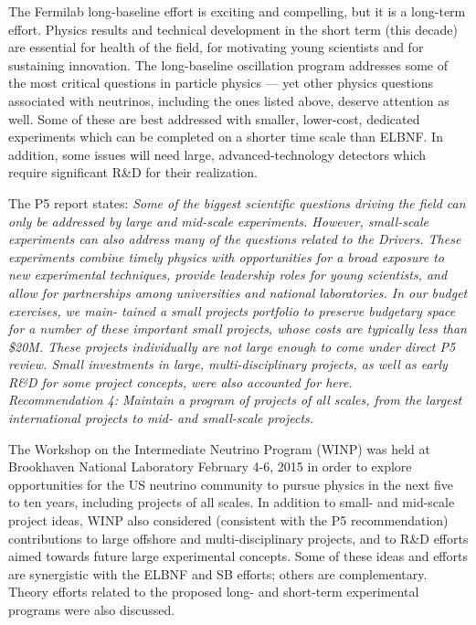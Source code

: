The Fermilab long-baseline effort is exciting and compelling, but it
is a long-term effort.  Physics results and technical development in
the short term (this decade) are essential for health of the field,
for motivating young scientists and for sustaining innovation.  The
long-baseline oscillation program addresses some of the most critical
questions in particle physics --- yet other physics questions
associated with neutrinos, including the ones listed above, deserve
attention as well.  Some of these are best addressed with smaller,
lower-cost, dedicated experiments which can be completed
on a shorter time scale than ELBNF.  In addition, some issues will
need large, advanced-technology detectors which require
significant R\&D for their realization.

The P5 report states:
\textit{Some of the biggest scientific questions driving the field can only be
addressed by large and mid-scale experiments. However, small-scale
experiments can also address many of the questions related to the
Drivers. These experiments combine timely physics with opportunities
for a broad exposure to new experimental techniques, provide
leadership roles for young scientists, and allow for partnerships
among universities and national laboratories. In our budget exercises,
we main- tained a small projects portfolio to preserve budgetary space
for a number of these important small projects, whose costs are
typically less than \$20M. These projects individually are not large
enough to come under direct P5 review. Small investments in large,
multi-disciplinary projects, as well as early R\&D for some project
concepts, were also accounted for here.}\\
\textit{{Recommendation 4: Maintain a program of projects of all
  scales, from the largest international projects to mid- and
  small-scale projects.}}


The Workshop on the Intermediate Neutrino Program (WINP) was held at
Brookhaven National Laboratory February 4-6, 2015 in order to explore
opportunities for the US neutrino community to pursue physics in the
next five to ten years, including projects of all scales.  In addition
to small- and mid-scale project ideas, WINP also considered
(consistent with the P5 recommendation) contributions to large
offshore and multi-disciplinary projects, and to R\&D efforts aimed
towards future large experimental concepts.  Some of these ideas and
efforts are synergistic with the ELBNF and SB efforts; others are
complementary.  Theory efforts related to the proposed long- and
short-term experimental programs were also discussed.


